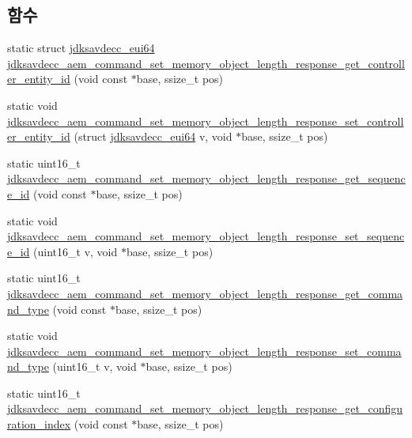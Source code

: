 \subsection*{함수}
\begin{DoxyCompactItemize}
\item 
static struct \hyperlink{structjdksavdecc__eui64}{jdksavdecc\+\_\+eui64} \hyperlink{group__command__set__memory__object__length__response_ga9eeb7724aa839effa234e947d76ea666}{jdksavdecc\+\_\+aem\+\_\+command\+\_\+set\+\_\+memory\+\_\+object\+\_\+length\+\_\+response\+\_\+get\+\_\+controller\+\_\+entity\+\_\+id} (void const $\ast$base, ssize\+\_\+t pos)
\item 
static void \hyperlink{group__command__set__memory__object__length__response_ga059fbf6070cf6b0c9f47bdc47dea2099}{jdksavdecc\+\_\+aem\+\_\+command\+\_\+set\+\_\+memory\+\_\+object\+\_\+length\+\_\+response\+\_\+set\+\_\+controller\+\_\+entity\+\_\+id} (struct \hyperlink{structjdksavdecc__eui64}{jdksavdecc\+\_\+eui64} v, void $\ast$base, ssize\+\_\+t pos)
\item 
static uint16\+\_\+t \hyperlink{group__command__set__memory__object__length__response_gad636af86cbaa2063e80b162dba7d00a8}{jdksavdecc\+\_\+aem\+\_\+command\+\_\+set\+\_\+memory\+\_\+object\+\_\+length\+\_\+response\+\_\+get\+\_\+sequence\+\_\+id} (void const $\ast$base, ssize\+\_\+t pos)
\item 
static void \hyperlink{group__command__set__memory__object__length__response_ga9ef79e1308e2d4b30ce2323ac5824374}{jdksavdecc\+\_\+aem\+\_\+command\+\_\+set\+\_\+memory\+\_\+object\+\_\+length\+\_\+response\+\_\+set\+\_\+sequence\+\_\+id} (uint16\+\_\+t v, void $\ast$base, ssize\+\_\+t pos)
\item 
static uint16\+\_\+t \hyperlink{group__command__set__memory__object__length__response_ga3b47eee1f7df23712dc12be6a9874643}{jdksavdecc\+\_\+aem\+\_\+command\+\_\+set\+\_\+memory\+\_\+object\+\_\+length\+\_\+response\+\_\+get\+\_\+command\+\_\+type} (void const $\ast$base, ssize\+\_\+t pos)
\item 
static void \hyperlink{group__command__set__memory__object__length__response_gac6b3cf0d873d08b199294e701f0570b7}{jdksavdecc\+\_\+aem\+\_\+command\+\_\+set\+\_\+memory\+\_\+object\+\_\+length\+\_\+response\+\_\+set\+\_\+command\+\_\+type} (uint16\+\_\+t v, void $\ast$base, ssize\+\_\+t pos)
\item 
static uint16\+\_\+t \hyperlink{group__command__set__memory__object__length__response_ga981d084ff9c8e992242d787271e36520}{jdksavdecc\+\_\+aem\+\_\+command\+\_\+set\+\_\+memory\+\_\+object\+\_\+length\+\_\+response\+\_\+get\+\_\+configuration\+\_\+index} (void const $\ast$base, ssize\+\_\+t pos)

\end{DoxyCompactItemize}
